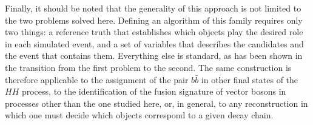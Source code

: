 


Finally, it should be noted that the generality of this approach is not limited to the two problems solved here. Defining an algorithm of this family requires only two things: a reference truth that establishes which objects play the desired role in each simulated event, and a set of variables that describes the candidates and the event that contains them. Everything else is standard, as has been shown in the transition from the first problem to the second. The same construction is therefore applicable to the assignment of the pair $b\bar{b}$ in other final states of the $HH$ process, to the identification of the fusion signature of vector bosons in processes other than the one studied here, or, in general, to any reconstruction in which one must decide which objects correspond to a given decay chain.


